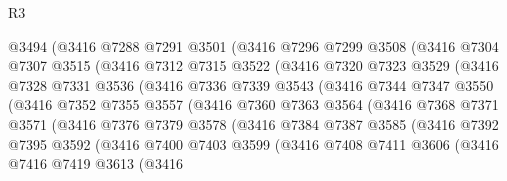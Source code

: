 \begin{lexlean}{R3}
\begin{coremodule}
              @3494
              (@3416
                @7288
                @7291
                @3501
                (@3416
                  @7296
                  @7299
                  @3508
                  (@3416
                    @7304
                    @7307
                    @3515
                    (@3416
                      @7312
                      @7315
                      @3522
                      (@3416
                        @7320
                        @7323
                        @3529
                        (@3416
                          @7328
                          @7331
                          @3536
                          (@3416
                            @7336
                            @7339
                            @3543
                            (@3416
                              @7344
                              @7347
                              @3550
                              (@3416
                                @7352
                                @7355
                                @3557
                                (@3416
                                  @7360
                                  @7363
                                  @3564
                                  (@3416
                                    @7368
                                    @7371
                                    @3571
                                    (@3416
                                      @7376
                                      @7379
                                      @3578
                                      (@3416
                                        @7384
                                        @7387
                                        @3585
                                        (@3416
                                          @7392
                                          @7395
                                          @3592
                                          (@3416
                                            @7400
                                            @7403
                                            @3599
                                            (@3416
                                              @7408
                                              @7411
                                              @3606
                                              (@3416
                                                @7416
                                                @7419
                                                @3613
                                                (@3416

\end{coremodule}
\end{lexlean}
